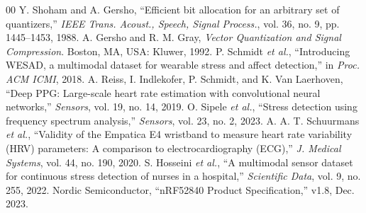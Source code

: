 \documentclass[journal]{IEEEtran}
\begin{document}
\begin{thebibliography}{00}
 Y. Shoham and A. Gersho, ``Efficient bit allocation for an arbitrary set of quantizers,'' \emph{IEEE Trans. Acoust., Speech, Signal Process.}, vol. 36, no. 9, pp. 1445--1453, 1988.
 A. Gersho and R. M. Gray, \emph{Vector Quantization and Signal Compression}. Boston, MA, USA: Kluwer, 1992.
 P. Schmidt \emph{et al.}, ``Introducing WESAD, a multimodal dataset for wearable stress and affect detection,'' in \emph{Proc. ACM ICMI}, 2018.
 A. Reiss, I. Indlekofer, P. Schmidt, and K. Van Laerhoven, ``Deep PPG: Large-scale heart rate estimation with convolutional neural networks,'' \emph{Sensors}, vol. 19, no. 14, 2019.
 O. Sipele \emph{et al.}, ``Stress detection using frequency spectrum analysis,'' \emph{Sensors}, vol. 23, no. 2, 2023.
 A. A. T. Schuurmans \emph{et al.}, ``Validity of the Empatica E4 wristband to measure heart rate variability (HRV) parameters: A comparison to electrocardiography (ECG),'' \emph{J. Medical Systems}, vol. 44, no. 190, 2020.
 S. Hosseini \emph{et al.}, ``A multimodal sensor dataset for continuous stress detection of nurses in a hospital,'' \emph{Scientific Data}, vol. 9, no. 255, 2022.
 Nordic Semiconductor, ``nRF52840 Product Specification,'' v1.8, Dec. 2023.
\end{thebibliography}
\end{document}
